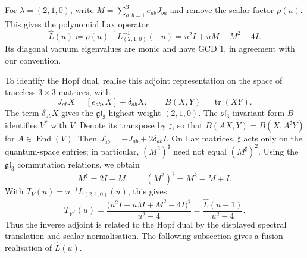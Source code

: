 \documentclass[12pt,reqno]{amsart}
\newcommand{\ID}{I}
\newcommand{\RF}[1]{(*{{\color{red}RF:  {#1}}}*)}
\numberwithin{equation}{section}
\begin{document}
For $\lambda=(2,1,0)$, write $M=\sum_{a,b=1}^3e_{ab}J_{ba}$
and remove the scalar factor $\rho(u)$. This gives the polynomial
Lax operator
\begin{equation*}
    \widehat L(u)\coloneqq\rho(u)^{-1}L_{(2,1,0)}^{-1}(-u)
    =u^2\ID+uM+M^2-4\ID.
\end{equation*}
Its diagonal vacuum eigenvalues are monic and have GCD $1$, in
agreement with our convention.

To identify the Hopf dual, realise this adjoint representation
on the space of traceless $3\times3$ matrices, with
\begin{equation*}
    J_{ab}X=[e_{ab},X]+\delta_{ab}X,
    \qquad B(X,Y)=\operatorname{tr}(XY).
\end{equation*}
The term $\delta_{ab}X$ gives the $\mathfrak{gl}_3$ highest weight
$(2,1,0)$. The $\mathfrak{sl}_3$-invariant form $B$ identifies
$V^*$ with $V$. Denote its transpose by $\sharp$, so that
$B(AX,Y)=B(X,A^\sharp Y)$ for $A\in\operatorname{End}(V)$.
Then $J_{ab}^\sharp=-J_{ab}+2\delta_{ab}\ID$.
On Lax matrices, $\sharp$ acts only on the quantum-space entries;
in particular, $(M^2)^\sharp$ need not equal $(M^\sharp)^2$.
Using the $\mathfrak{gl}_3$ commutation relations, we obtain
\begin{equation*}
    M^\sharp=2\ID-M,
    \qquad
    (M^2)^\sharp=M^2-M+\ID.
\end{equation*}
With $T_V(u)=u^{-1}L_{(2,1,0)}(u)$, this gives
\begin{equation*}
    T_{V^\vee}(u)
    =\frac{\bigl(u^2\ID-uM+M^2-4\ID\bigr)^\sharp}{u^2-4}
    =\frac{\widehat L(u-1)}{u^2-4}.
\end{equation*}
Thus the inverse adjoint is related to the Hopf dual by the
displayed spectral translation and scalar normalisation.
The following subsection gives a fusion realisation of
$\widehat L(u)$.








\end{document}
